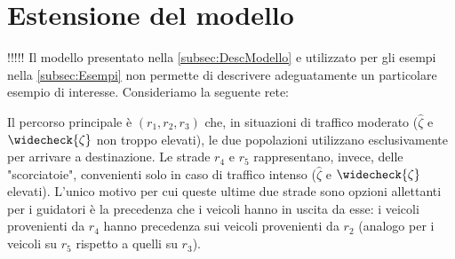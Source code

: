 \section{Estensione del modello}!!!!!
\label{sec:Critica}
Il modello presentato nella \autoref{subsec:DescModello} e utilizzato per gli esempi nella \autoref{subsec:Esempi} non permette di descrivere adeguatamente un particolare esempio di interesse.
Consideriamo la seguente rete:
\begin{figure}[h!]
\centering


\end{figure}

Il percorso principale è $(r_1, r_2, r_3)$ che, in situazioni di traffico moderato ($\widehat{\zeta}$ e $\widecheck{\zeta}$ non troppo elevati), le due popolazioni utilizzano esclusivamente per arrivare a destinazione.
Le strade $r_4$ e $r_5$ rappresentano, invece, delle "scorciatoie", convenienti solo in caso di traffico intenso ($\widehat{\zeta}$ e $\widecheck{\zeta}$ elevati). L'unico motivo
per cui queste ultime due strade sono opzioni allettanti per i guidatori è la precedenza che i veicoli hanno in uscita da esse: i veicoli provenienti da $r_4$ hanno precedenza sui veicoli
provenienti da $r_2$ (analogo per i veicoli su $r_5$ rispetto a quelli su $r_3$).

